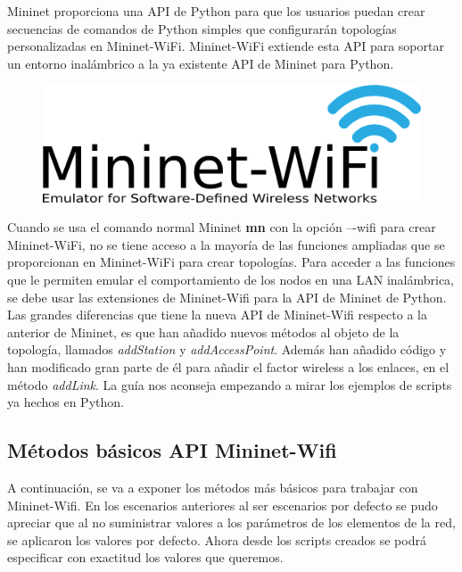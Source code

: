 Mininet proporciona una API de Python para que los usuarios puedan crear secuencias de comandos de Python simples que configurarán 
topologías personalizadas en Mininet-WiFi. Mininet-WiFi extiende esta API para soportar un entorno inalámbrico a la ya existente API de Mininet para Python.\newline
\newline
\begin{figure}[!htb]
  \centering
    \includegraphics[width=0.8\linewidth]{./img/mininet-wifi-logo.png}
\end{figure}

Cuando se usa el comando normal Mininet \textbf{mn} con la opción –-wifi para crear Mininet-WiFi, no se tiene acceso a la mayoría de las funciones ampliadas que se proporcionan en Mininet-WiFi para crear topologías. Para acceder a las funciones que le permiten emular el comportamiento de los nodos en una LAN inalámbrica, se debe
usar las extensiones de Mininet-Wifi para la API de Mininet de Python.\newline
\newline
Las grandes diferencias que tiene la nueva API de Mininet-Wifi respecto a la anterior de Mininet, es que han añadido nuevos métodos al objeto de la topología, llamados \textit{addStation} y \textit{addAccessPoint}. Además han añadido código y han modificado gran parte de él para añadir el factor wireless a los enlaces, en el método \textit{addLink}. La guía nos aconseja empezando a mirar los ejemplos de scripts ya hechos en Python.\newline

\subsection{Métodos básicos API Mininet-Wifi}
\newline
A continuación, se va a exponer los métodos más básicos para trabajar con Mininet-Wifi. En los escenarios anteriores al ser escenarios por defecto se pudo apreciar que al no suministrar valores a los parámetros de los elementos de la red, se aplicaron los valores por defecto. Ahora desde los scripts creados se podrá especificar con exactitud los valores que queremos. 

